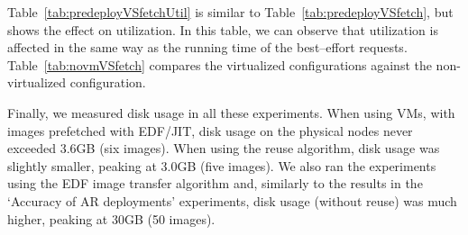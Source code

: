 Table~\ref{tab:predeployVSfetchUtil} is similar to Table~\ref{tab:predeployVSfetch}, but shows the effect on utilization. In this table, we can observe that utilization is affected in the same way as the running time of the best--effort requests. Table~\ref{tab:novmVSfetch} compares the virtualized configurations against the non-virtualized configuration.

Finally, we measured disk usage in all these experiments. When using VMs, with images prefetched with EDF/JIT, disk usage on the physical nodes never exceeded 3.6GB (six images). When using the reuse algorithm, disk usage was slightly smaller, peaking at 3.0GB (five images). We also ran the experiments using the EDF image transfer algorithm and, similarly to the results in the `Accuracy of AR deployments' experiments, disk usage (without reuse) was much higher, peaking at 30GB (50 images).

